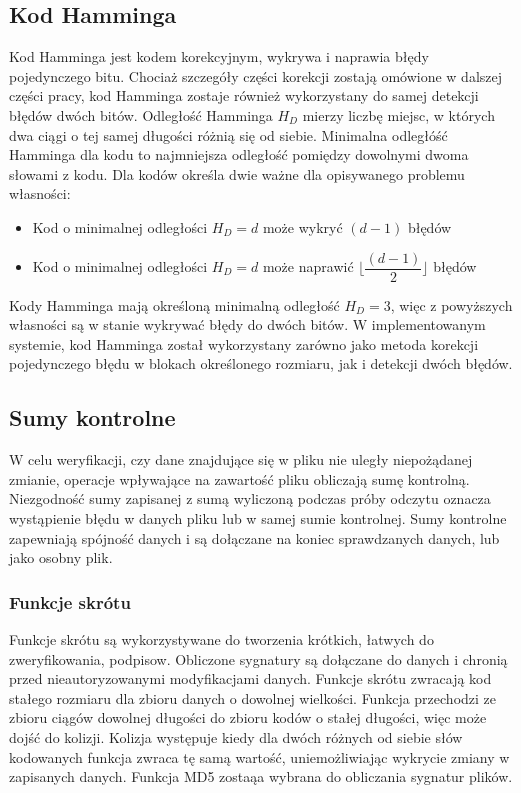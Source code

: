 \subsection{Kod Hamminga}
Kod Hamminga \cite{Hamming} jest kodem korekcyjnym, wykrywa i naprawia błędy pojedynczego bitu. Chociaż szczegóły części korekcji zostają omówione w dalszej części pracy, kod Hamminga zostaje również wykorzystany do samej detekcji błędów dwóch bitów.
Odległość Hamminga $H_D$ mierzy liczbę miejsc, w których dwa ciągi o tej samej długości różnią się od siebie. Minimalna odległóść Hamminga dla kodu to najmniejsza odległość pomiędzy dowolnymi dwoma słowami z kodu. Dla kodów określa dwie ważne dla opisywanego problemu własności:
\begin{itemize}
        \item Kod  o minimalnej odległości $H_D = d$ może wykryć $(d-1)$ błędów
        \item Kod o minimalnej odległości $H_D = d$ może naprawić $\lfloor\dfrac{(d-1)}{2}\rfloor$ błędów
\end{itemize}
Kody Hamminga mają określoną minimalną odległość $H_D = 3$, więc z powyższych własności są w stanie wykrywać błędy do dwóch bitów.  W implementowanym systemie, kod Hamminga został wykorzystany zarówno jako metoda korekcji pojedynczego błędu w blokach określonego rozmiaru, jak i detekcji dwóch błędów.


\subsection{Sumy kontrolne}
    W celu weryfikacji, czy dane znajdujące się w pliku nie uległy niepożądanej zmianie, operacje wpływające na zawartość pliku obliczają sumę kontrolną. Niezgodność sumy zapisanej z sumą wyliczoną podczas próby odczytu oznacza wystąpienie błędu w danych pliku lub w samej sumie kontrolnej. Sumy kontrolne zapewniają spójność danych i są dołączane na koniec sprawdzanych danych, lub jako osobny plik. 
\subsubsection{Funkcje skrótu}
Funkcje skrótu są wykorzystywane do tworzenia krótkich, łatwych do zweryfikowania, podpisow. Obliczone sygnatury są dołączane do danych i chronią przed nieautoryzowanymi modyfikacjami danych. Funkcje skrótu zwracają kod stałego rozmiaru dla zbioru danych o dowolnej wielkości. Funkcja przechodzi ze zbioru ciągów dowolnej długości do zbioru kodów o stałej długości, więc może dojść do kolizji. Kolizja występuje kiedy dla dwóch różnych od siebie słów kodowanych funkcja zwraca tę samą wartość, uniemożliwiając wykrycie zmiany w zapisanych danych. Funkcja MD5 zostaąa wybrana do obliczania sygnatur plików.
